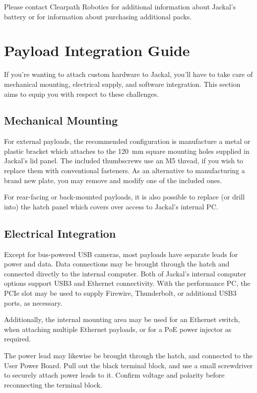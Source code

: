 \documentclass[]{clearpath-latex/clearpath-manual}
\begin{document}
Please contact Clearpath Robotics for additional information about Jackal's battery or
for information about purchasing additional packs.


\section{Payload Integration Guide}

If you're wanting to attach custom hardware to Jackal, you'll have to take care of
mechanical mounting, electrical supply, and software integration. This section
aims to equip you with respect to these challenges.


\subsection{Mechanical Mounting}

For external payloads, the recommended configuration is manufacture a metal or plastic bracket
which attaches to the \SI{120}{\mm} square mounting holes supplied in Jackal's lid
panel. The included thumbscrews use an M5 thread, if you wish to replace them with conventional
fasteners. As an alternative to manufacturing a brand new plate, you may remove and modify one
of the included ones.

For rear-facing or back-mounted payloads, it is also possible to replace (or drill into) the
hatch panel which covers over access to Jackal's internal PC.

\subsection{Electrical Integration}\label{payload-elec}

Except for bus-powered USB cameras, most payloads have separate leads for power and data. Data
connections may be brought through the hatch and connected directly to the internal computer. Both
of Jackal's internal computer options support USB3 and Ethernet connectivity. With the performance
PC, the PCIe slot may be used to supply Firewire, Thunderbolt, or additional USB3 ports, as necessary.

Additionally, the internal mounting area may be used for an Ethernet switch, when attaching multiple
Ethernet payloads, or for a PoE power injector as required.

The power lead may likewise be brought through the hatch, and connected to the User Power Board. Pull
out the black terminal block, and use a small screwdriver to securely attach power leads to it.
Confirm voltage and polarity before reconnecting the terminal block.
\end{document}
